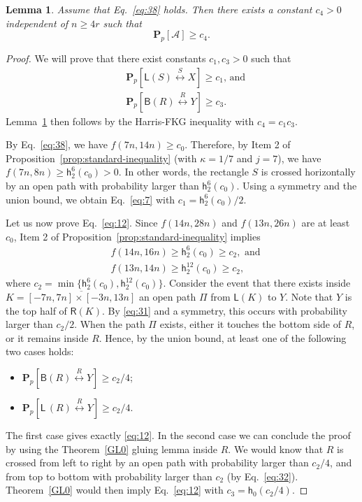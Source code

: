 \documentclass[12pt, twoside,a4paper,reqno]{amsart}
\theoremstyle{plain}
\newtheorem{lemma}[theorem]{Lemma}
\theoremstyle{remark}
\theoremstyle{definition}
\newcommand{\PP}{\mathbf{P}}
\newcommand{\Pp}[1]{\PP_p \left [ #1 \right ]}
\newcommand{\lr}[1][]{\overset{\:#1\:}\longleftrightarrow}
\newcommand{\ol}{\overline}
\begin{document}
\begin{lemma}\label{lem:RSW1}
  Assume that Eq.~\eqref{eq:38} holds. Then there exists a constant $c_4>0$
  independent of $n\ge 4r$ such that
  \begin{equation}
    \label{eq:39}
    \Pp{\mathcal A}\ge c_4.
  \end{equation}
\end{lemma}
\begin{proof}
  We will prove that there exist constants $c_1,c_3>0$ such that
  \begin{align}
    \label{eq:7}&\Pp{\mathsf L(S)\lr[S] X}\ge c_1\text{, and}\\
    \label{eq:12}&\Pp{ \mathsf B(R)\lr[R] Y}\ge c_3.
  \end{align}
  Lemma~\ref{lem:RSW1} then follows by the Harris-FKG inequality with $c_4 = c_1c_3$.

  By Eq.~\eqref{eq:38}, we have $f(7n,14n)\ge c_0$. Therefore, by Item 2 of
  Proposition~\ref{prop:standard-inequality} (with $\kappa=1/7$ and $j=7$), we have $f(7n,8n)\ge \mathsf
  h_2^6(c_0)>0$. In other words, the rectangle $S$ is crossed horizontally by
  an open path with probability larger than $\mathsf h_2^6(c_0)$. Using a
  symmetry and the union bound, we obtain Eq.~\eqref{eq:7} with
  $c_1=\mathsf h_2^6(c_0)/2$.


  Let us now prove Eq.~\eqref{eq:12}. Since  $f(14n,28n)$ and
  $f(13n,26n)$ are at least $c_0$,
  Item 2 of Proposition~\ref{prop:standard-inequality} implies
  \begin{align}
    \label{eq:31}&f(14n,16n)\ge \mathsf h^{6}_2(c_0) \ge c_2,\text{ and}\\
    \label{eq:32}&f(13n,14n)\ge \mathsf h^{12}_2(c_0) \ge c_2,
  \end{align}
  where $c_2=\min\{\mathsf h^{6}_2(c_0), \mathsf h^{12}_2(c_0)\}$. Consider the event that there exists inside \\
  $K=\ol{[-7n,7n]\times[-3n,13n]}$ an open path $\Pi$ from $\mathsf L(K)$ to
  $Y$. Note that $Y$ is the top half of $\mathsf R(K)$. By \eqref{eq:31} and a symmetry, this occurs with probability larger
  than $c_2/2$. When the path $\Pi$ exists, either it touches the bottom side of
  $R$, or it remains inside $R$. Hence, by the union bound, at least one of the
  following two cases holds:
  \begin{itemize}
    \item $\Pp{ \mathsf B(R)\lr[R] Y} \ge c_2/4$;
    \item $\Pp{ \mathsf L\,(R)\lr[R] Y} \ge c_2/4$.
  \end{itemize}
  The first case gives exactly \eqref{eq:12}. In the second case we can conclude the proof by
  using the Theorem~\ref{GL0} gluing lemma inside $R$. We would know that $R$
  is crossed from left to right by an open path with probability larger than
  $c_2/4$, and from top to bottom with probability larger than $c_2$ (by
  Eq.~\eqref{eq:32}). Theorem~\ref{GL0} would then imply Eq.~\eqref{eq:12} with $c_3=\mathsf h_0(c_2/4)$.
\end{proof}
\end{document}
